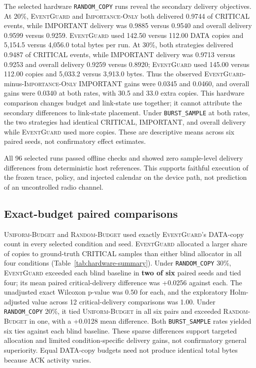 \documentclass[11pt]{article}
\newcommand{\EG}{\textsc{EventGuard}}
\newcommand{\IO}{\textsc{Importance-Only}}
\newcommand{\UB}{\textsc{Uniform-Budget}}
\newcommand{\RB}{\textsc{Random-Budget}}
\begin{document}
The selected hardware \texttt{RANDOM\_COPY} runs reveal the secondary delivery objectives. At 20\%, \EG{} and \IO{} both delivered 0.9744 of CRITICAL events, while IMPORTANT delivery was 0.9885 versus 0.9540 and overall delivery 0.9599 versus 0.9259. \EG{} used 142.50 versus 112.00 DATA copies and 5,154.5 versus 4,056.0 total bytes per run. At 30\%, both strategies delivered 0.9487 of CRITICAL events, while IMPORTANT delivery was 0.9713 versus 0.9253 and overall delivery 0.9259 versus 0.8920; \EG{} used 145.00 versus 112.00 copies and 5,033.2 versus 3,913.0 bytes. Thus the observed \EG{}-minus-\IO{} IMPORTANT gains were 0.0345 and 0.0460, and overall gains were 0.0340 at both rates, with 30.5 and 33.0 extra copies. This hardware comparison changes budget and link-state use together; it cannot attribute the secondary differences to link-state placement. Under \texttt{BURST\_SAMPLE} at both rates, the two strategies had identical CRITICAL, IMPORTANT, and overall delivery while \EG{} used more copies. These are descriptive means across six paired seeds, not confirmatory effect estimates.

All 96 selected runs passed offline checks and showed zero sample-level delivery differences from deterministic host references. This supports faithful execution of the frozen trace, policy, and injected calendar on the device path, not prediction of an uncontrolled radio channel.

\subsection{Exact-budget paired comparisons}\label{sec:exact-budget-paired-comparisons}

\UB{} and \RB{} used exactly \EG{}'s DATA-copy count in every selected condition and seed. \EG{} allocated a larger share of copies to ground-truth CRITICAL samples than either blind allocator in all four conditions (Table~\ref{tab:hardware-summary}). Under \texttt{RANDOM\_COPY} 30\%, \EG{} exceeded each blind baseline in \textbf{two of six} paired seeds and tied four; its mean paired critical-delivery difference was +0.0256 against each. The unadjusted exact Wilcoxon p-value was 0.50 for each, and the exploratory Holm-adjusted value across 12 critical-delivery comparisons was 1.00. Under \texttt{RANDOM\_COPY} 20\%, it tied \UB{} in all six pairs and exceeded \RB{} in one, with a +0.0128 mean difference. Both \texttt{BURST\_SAMPLE} rates yielded six ties against each blind baseline. These sparse differences support targeted allocation and limited condition-specific delivery gains, not confirmatory general superiority. Equal DATA-copy budgets need not produce identical total bytes because ACK activity varies.
\end{document}
